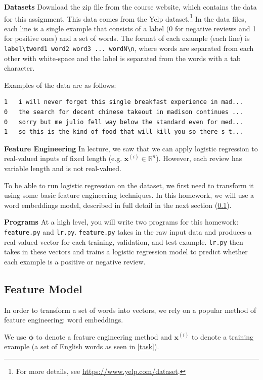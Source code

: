 \documentclass[11pt,addpoints,answers]{exam}
\newcommand{\xv}{\mathbf{x}}
\begin{document}
{\bf Datasets } 
Download the zip file from the course website, which contains the data for this assignment. This data comes from the Yelp dataset.\footnote{For more details, see \url{https://www.yelp.com/dataset}.} In the data files, each line is a single example that consists of a label (0 for negative reviews and 1 for positive ones) and a set of words. The format of each example (each line) is \lstinline{label\tword1 word2 word3 ... wordN\n}, where words are separated from each other with white-space and the label is separated from the words with a tab character.

Examples of the data are as follows:
 
\begin{lstlisting}
1   i will never forget this single breakfast experience in mad... 
0   the search for decent chinese takeout in madison continues ...
0   sorry but me julio fell way below the standard even for med...
1   so this is the kind of food that will kill you so there s t...
\end{lstlisting}

{\bf Feature Engineering } 
In lecture, we saw that we can apply logistic regression to real-valued inputs of fixed length (e.g. $\xv^{(i)}\in\mathbb{R}^n$). However, each review has variable length and is not real-valued.

To be able to run logistic regression on the dataset, we first need to transform it using some basic feature engineering techniques. In this homework, we will use a word embeddings model, described in full detail in the next section (\ref{featuremodels}).

{\bf Programs } 
At a high level, you will write two programs for this homework: \texttt{feature.py} and \texttt{lr.py}. \texttt{feature.py} takes in the raw input data and produces a real-valued vector for each training, validation, and test example. \texttt{lr.py} then takes in these vectors and trains a logistic regression model to predict whether each example is a positive or negative review.


\subsection{Feature Model}\label{featuremodels}
In order to transform a set of words into vectors, we rely on a popular method of feature engineering: word embeddings.

We use $\boldsymbol{\phi}$ to denote a feature engineering method and $\xv^{(i)}$ to denote a training example (a set of English words as seen in \ref{task}).
\end{document}
